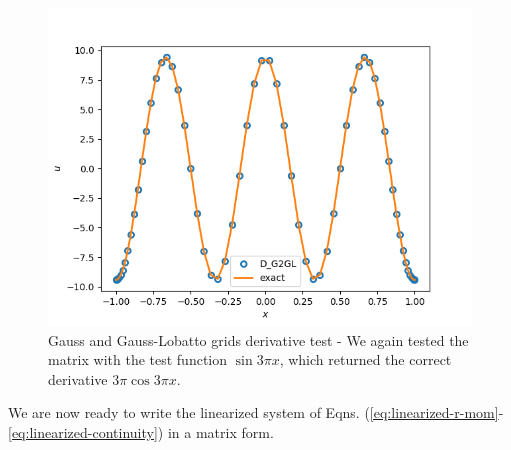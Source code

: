 \documentclass{article}
\begin{document}
\begin{figure}[H]
        \centering
    \includegraphics[scale=0.5]{Figs/test_D_g2gl_interpolant.png}
            \caption{Gauss and Gauss-Lobatto grids derivative test - We again tested the matrix with the test function $\sin{3\pi x}$, which returned the correct derivative $3\pi\cos{3\pi x}$.  }
        \label{fig:test_D_g2gl_interpolant}
\end{figure}
We are now ready to write the linearized system of Eqns. (\ref{eq:linearized-r-mom}-\ref{eq:linearized-continuity}) in a matrix form. 
\end{document}
